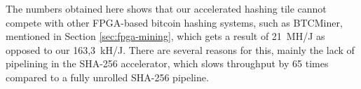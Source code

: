 The numbers obtained here shows that our accelerated hashing tile cannot compete with other FPGA-based bitcoin hashing systems,
such as BTCMiner, mentioned in Section \ref{sec:fpga-mining}, which gets a result of 21~MH/J as opposed to our 163,3~kH/J.
There are several reasons for this, mainly the lack of pipelining in the SHA-256 accelerator, which slows throughput by 65 times
compared to a fully unrolled SHA-256 pipeline.


%



